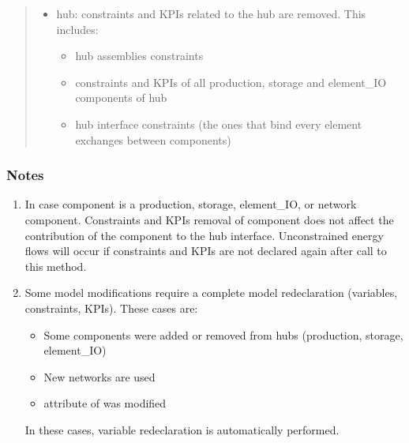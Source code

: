 \documentclass[letterpaper,10pt,english]{sphinxmanual}
\begin{document}
\begin{fulllineitems}
\begin{fulllineitems}
\begin{quote}
\begin{description}
\begin{itemize}
\item {} 
\sphinxAtStartPar
hub: constraints and KPIs related to the hub are removed. This includes:
\begin{itemize}
\item {} 
\sphinxAtStartPar
hub assemblies constraints

\item {} 
\sphinxAtStartPar
constraints and KPIs of all production, storage and element\_IO components of hub

\item {} 
\sphinxAtStartPar
hub interface constraints (the ones that bind every element exchanges between components)

\end{itemize}

\end{itemize}


\end{description}\end{quote}
\subsubsection*{Notes}
\begin{enumerate}
%
\item {} 
\sphinxAtStartPar
In case component is a production, storage, element\_IO, or network component.
Constraints and KPIs removal of component does not affect the contribution of the component to the hub interface.
Unconstrained energy flows will occur if constraints and KPIs are not declared again after call to this method.

\item {} 
\sphinxAtStartPar
Some model modifications require a complete model redeclaration (variables, constraints, KPIs). These cases are:
\begin{itemize}
\item {} 
\sphinxAtStartPar
Some components were added or removed from hubs (production, storage, element\_IO)

\item {} 
\sphinxAtStartPar
New networks are used

\item {} 
\sphinxAtStartPar
{} attribute of  was modified

\end{itemize}

\sphinxAtStartPar
In these cases, variable redeclaration is automatically performed.


\end{enumerate}
\end{fulllineitems}
\end{fulllineitems}
\end{document}
